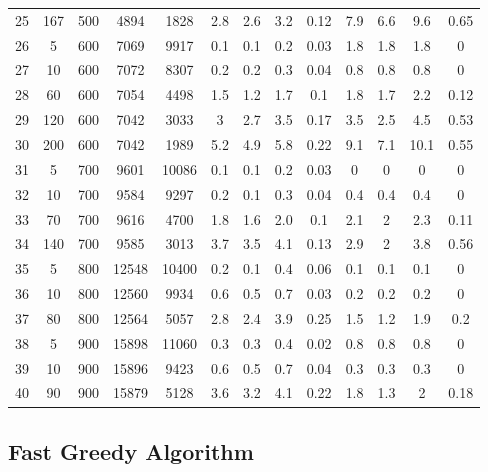 \documentclass[11pt]{article}
\begin{document}
\begin{appendices}
\begin{landscape}
\begin{longtable}[c]{ccccc|cccc|cccc}
				25 & 167 & 500 & 4894 & 1828 & 2.8 & 2.6 & 3.2 & 0.12 & 7.9 & 6.6 & 9.6 & 0.65 \\
				26 & 5 & 600 & 7069 & 9917 & 0.1 & 0.1 & 0.2 & 0.03 & 1.8 & 1.8 & 1.8 & 0 \\
				27 & 10 & 600 & 7072 & 8307 & 0.2 & 0.2 & 0.3 & 0.04 & 0.8 & 0.8 & 0.8 & 0 \\
				28 & 60 & 600 & 7054 & 4498 & 1.5 & 1.2 & 1.7 & 0.1 & 1.8 & 1.7 & 2.2 & 0.12 \\
				29 & 120 & 600 & 7042 & 3033 & 3 & 2.7 & 3.5 & 0.17 & 3.5 & 2.5 & 4.5 & 0.53 \\
				30 & 200 & 600 & 7042 & 1989 & 5.2 & 4.9 & 5.8 & 0.22 & 9.1 & 7.1 & 10.1 & 0.55 \\
				\rowcolor[HTML]{EFEFEF} 
				31 & 5 & 700 & 9601 & 10086 & 0.1 & 0.1 & 0.2 & 0.03 & 0 & 0 & 0 & 0 \\
				\rowcolor[HTML]{EFEFEF} 
				32 & 10 & 700 & 9584 & 9297 & 0.2 & 0.1 & 0.3 & 0.04 & 0.4 & 0.4 & 0.4 & 0 \\
				\rowcolor[HTML]{EFEFEF} 
				33 & 70 & 700 & 9616 & 4700 & 1.8 & 1.6 & 2.0 & 0.1 & 2.1 & 2 & 2.3 & 0.11 \\
				\rowcolor[HTML]{EFEFEF} 
				34 & 140 & 700 & 9585 & 3013 & 3.7 & 3.5 & 4.1 & 0.13 & 2.9 & 2 & 3.8 & 0.56 \\
				35 & 5 & 800 & 12548 & 10400 & 0.2 & 0.1 & 0.4 & 0.06 & 0.1 & 0.1 & 0.1 & 0 \\
				36 & 10 & 800 & 12560 & 9934 & 0.6 & 0.5 & 0.7 & 0.03 & 0.2 & 0.2 & 0.2 & 0 \\
				37 & 80 & 800 & 12564 & 5057 & 2.8 & 2.4 & 3.9 & 0.25 & 1.5 & 1.2 & 1.9 & 0.2 \\
				\rowcolor[HTML]{EFEFEF} 
				38 & 5 & 900 & 15898 & 11060 & 0.3 & 0.3 & 0.4 & 0.02 & 0.8 & 0.8 & 0.8 & 0 \\
				\rowcolor[HTML]{EFEFEF} 
				39 & 10 & 900 & 15896 & 9423 & 0.6 & 0.5 & 0.7 & 0.04 & 0.3 & 0.3 & 0.3 & 0 \\
				\rowcolor[HTML]{EFEFEF} 
				40 & 90 & 900 & 15879 & 5128 & 3.6 & 3.2 & 4.1 & 0.22 & 1.8 & 1.3 & 2 & 0.18
			\end{longtable}
		\end{landscape}
		
		\subsection{Fast Greedy Algorithm}
		

\end{appendices}
\end{document}
